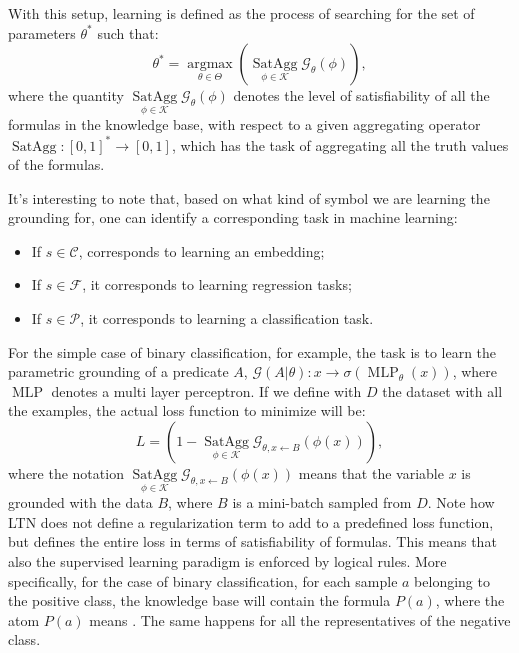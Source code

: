 With this setup, learning is defined as the process of searching for the set of parameters $\theta^*$ such that:
 	\begin{equation*}
 	\theta^{*}=\underset{\theta \in \Theta}{\operatorname{argmax}} \left(\underset{\phi \in \mathcal{K}} {\operatorname{SatAgg}} \mathcal{G}_{\theta}(\phi)\right),
 	\end{equation*} 
 where the quantity $\underset{\phi \in \mathcal{K}} {\operatorname{SatAgg}} \mathcal{G}_{\theta}(\phi)$ denotes the level of satisfiability of all the formulas in the knowledge base, with respect to a given aggregating operator $\operatorname{SatAgg}:\left[0,1\right]^* \rightarrow \left[0,1\right]$, which has the task of aggregating all the truth values of the formulas.

 
 It's interesting to note that, based on what kind of symbol we are learning the grounding for, one can identify a corresponding task in machine learning:
 \begin{itemize}
 	\item If $s \in \mathcal{C}$, corresponds to learning an embedding;
 	\item If $s \in \mathcal{F}$, it corresponds to learning regression tasks;
 	\item If $s \in \mathcal{P}$, it corresponds to learning a classification task.
 \end{itemize}
For the simple case of binary classification, for example, the task is to learn the parametric grounding of a predicate $A$, $\mathcal{G}(A|\theta):x \rightarrow \sigma(\operatorname{MLP}_{\theta}(x))$, where $\operatorname{MLP}$ denotes a multi layer perceptron. If we define with $D$ the dataset with all the examples, the actual loss function to minimize will be:
	\begin{equation*}
	L = \left(1 - \underset{\phi \in \mathcal{K}} {\operatorname{SatAgg}} \mathcal{G}_{\theta,x\leftarrow B}(\phi(x)) \right),
	\end{equation*}
	where the notation $\underset{\phi \in \mathcal{K}} {\operatorname{SatAgg}} \mathcal{G}_{\theta,x\leftarrow B}(\phi(x))$ means that the variable $x$ is grounded with the data $B$, where $B$ is a mini-batch sampled from $D$. 
	Note how LTN does not define a regularization term to add to a predefined loss function, but defines the entire loss in terms of satisfiability of formulas. This means that also the supervised learning paradigm is enforced by logical rules. More specifically, for the case of binary classification, for each sample $a$ belonging to the positive class, the knowledge base will contain the formula $P(a)$, where the atom $P(a)$ means . The same happens for all the representatives of the negative class.

